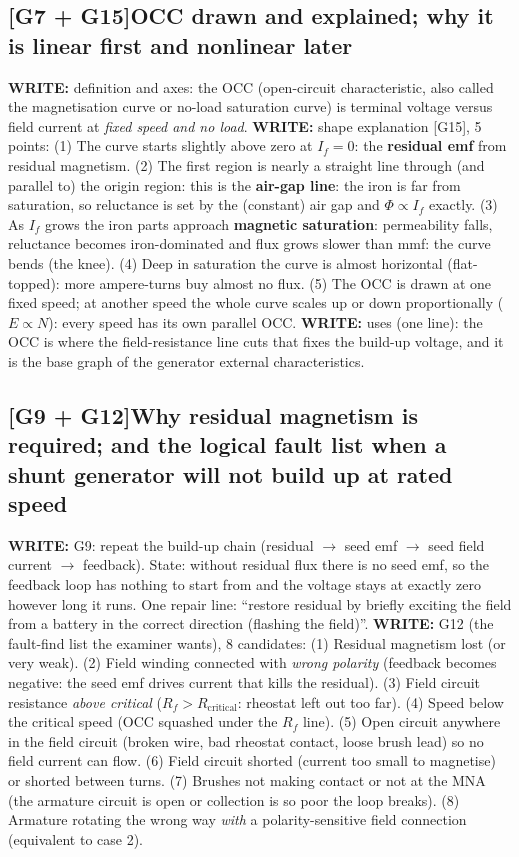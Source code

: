 \documentclass[11pt]{article}
\newcommand{\q}[2]{\subsection*{\color{copper}#1\quad\color{iron}#2}}
\newcommand{\w}[1]{\textbf{\color{copper}WRITE:} #1}
\begin{document}
\q{[G7 + G15]}{OCC drawn and explained; why it is linear first and nonlinear later}
\w{definition and axes:} the OCC (open-circuit characteristic, also called the magnetisation curve or no-load saturation curve) is terminal voltage versus field current at \emph{fixed speed and no load}.
\w{shape explanation [G15], 5 points:} (1) The curve starts slightly above zero at $I_f = 0$: the \textbf{residual emf} from residual magnetism. (2) The first region is nearly a straight line through (and parallel to) the origin region: this is the \textbf{air-gap line}: the iron is far from saturation, so reluctance is set by the (constant) air gap and $\Phi \propto I_f$ exactly. (3) As $I_f$ grows the iron parts approach \textbf{magnetic saturation}: permeability falls, reluctance becomes iron-dominated and flux grows slower than mmf: the curve bends (the knee). (4) Deep in saturation the curve is almost horizontal (flat-topped): more ampere-turns buy almost no flux. (5) The OCC is drawn at one fixed speed; at another speed the whole curve scales up or down proportionally ($E \propto N$): every speed has its own parallel OCC.
\w{uses (one line):} the OCC is where the field-resistance line cuts that fixes the build-up voltage, and it is the base graph of the generator external characteristics.

\q{[G9 + G12]}{Why residual magnetism is required; and the logical fault list when a shunt generator will not build up at rated speed}
\w{G9:} repeat the build-up chain (residual $\rightarrow$ seed emf $\rightarrow$ seed field current $\rightarrow$ feedback). State: without residual flux there is no seed emf, so the feedback loop has nothing to start from and the voltage stays at exactly zero however long it runs. One repair line: ``restore residual by briefly exciting the field from a battery in the correct direction (flashing the field)''.
\w{G12 (the fault-find list the examiner wants), 8 candidates:} (1) Residual magnetism lost (or very weak). (2) Field winding connected with \emph{wrong polarity} (feedback becomes negative: the seed emf drives current that kills the residual). (3) Field circuit resistance \emph{above critical} ($R_f > R_{\text{critical}}$: rheostat left out too far). (4) Speed below the critical speed (OCC squashed under the $R_f$ line). (5) Open circuit anywhere in the field circuit (broken wire, bad rheostat contact, loose brush lead) so no field current can flow. (6) Field circuit shorted (current too small to magnetise) or shorted between turns. (7) Brushes not making contact or not at the MNA (the armature circuit is open or collection is so poor the loop breaks). (8) Armature rotating the wrong way \emph{with} a polarity-sensitive field connection (equivalent to case 2).
\end{document}
